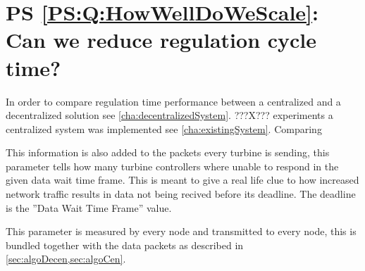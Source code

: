 \section{PS \ref{PS:Q:HowWellDoWeScale}: Can we reduce regulation cycle time?}
In order to compare regulation time performance between a centralized and a decentralized solution see \cref{cha:decentralizedSystem}. ???X??? experiments a centralized system was implemented see \cref{cha:existingSystem}.
Comparing 

This information is also added to the packets every turbine is sending, this parameter tells how many turbine controllers where unable to respond in the given data wait time frame. This is meant to give a real life clue to how increased network traffic results in data not being recived before its deadline. The deadline is the ''Data Wait Time Frame'' value.

This parameter is measured by every node and transmitted to every node, this is bundled together with the data packets as described in \cref{sec:algoDecen,sec:algoCen}.
